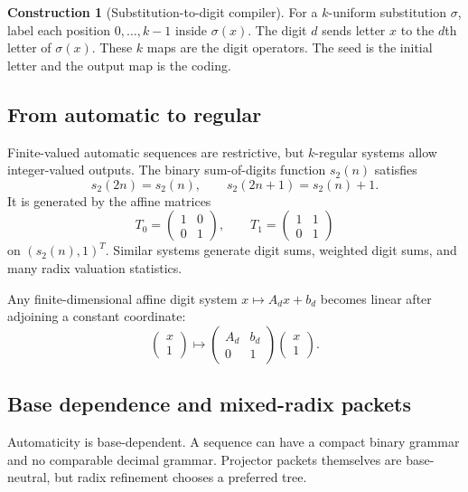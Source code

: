 \documentclass[11pt]{article}
\theoremstyle{definition}\newtheorem{definition}[theorem]{Definition}\newtheorem{example}[theorem]{Example}\newtheorem{construction}[theorem]{Construction}\newtheorem{algorithm}[theorem]{Algorithm}\newtheorem{conjecture}[theorem]{Conjecture}\newtheorem{problem}[theorem]{Problem}
\theoremstyle{remark}\newtheorem{remark}[theorem]{Remark}\newtheorem{boundary}[theorem]{Boundary}\newtheorem{certificate}[theorem]{Computational Certificate}\newtheorem{classical}[theorem]{Classical Input}\newtheorem{principle}[theorem]{Structural Principle}
\begin{document}
\begin{construction}[Substitution-to-digit compiler]
For a $k$-uniform substitution $\sigma$, label each position $0,\ldots,k-1$ inside $\sigma(x)$.  The digit $d$ sends letter $x$ to the $d$th letter of $\sigma(x)$.  These $k$ maps are the digit operators.  The seed is the initial letter and the output map is the coding.
\end{construction}

\subsection{From automatic to regular}
Finite-valued automatic sequences are restrictive, but $k$-regular systems allow integer-valued outputs.  The binary sum-of-digits function $s_2(n)$ satisfies
\[
 s_2(2n)=s_2(n),\qquad s_2(2n+1)=s_2(n)+1.
\]
It is generated by the affine matrices
\[
 T_0=\begin{pmatrix}1&0\\0&1\end{pmatrix},\qquad
 T_1=\begin{pmatrix}1&1\\0&1\end{pmatrix}
\]
on $(s_2(n),1)^T$.  Similar systems generate digit sums, weighted digit sums, and many radix valuation statistics.

\begin{proposition}
Any finite-dimensional affine digit system $x\mapsto A_dx+b_d$ becomes linear after adjoining a constant coordinate:
\[
 \begin{pmatrix}x\\1\end{pmatrix}
 \longmapsto
 \begin{pmatrix}A_d&b_d\\0&1\end{pmatrix}
 \begin{pmatrix}x\\1\end{pmatrix}.
\]
\end{proposition}

\subsection{Base dependence and mixed-radix packets}
Automaticity is base-dependent.  A sequence can have a compact binary grammar and no comparable decimal grammar.  Projector packets themselves are base-neutral, but radix refinement chooses a preferred tree.
\end{document}
